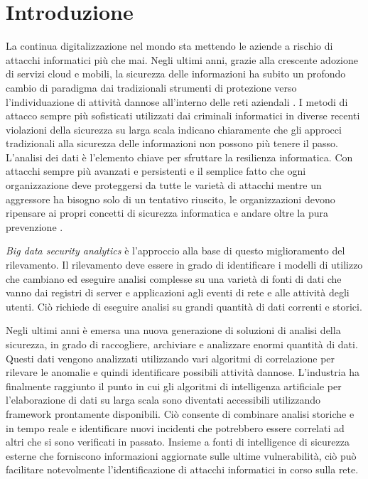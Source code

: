 \documentclass[../main.tex]{subfiles}
\begin{document}
\chapter{Introduzione}

La continua digitalizzazione nel mondo sta mettendo le aziende a rischio di attacchi informatici più che mai. Negli ultimi anni, grazie alla crescente adozione di servizi cloud e mobili, la sicurezza delle informazioni ha subito un profondo cambio di paradigma dai tradizionali strumenti di protezione verso l'individuazione di attività dannose all'interno delle reti aziendali \cite{intro}.
I metodi di attacco sempre più sofisticati utilizzati dai criminali informatici in diverse recenti violazioni della sicurezza su larga scala indicano chiaramente che gli approcci tradizionali alla sicurezza delle informazioni non possono più tenere il passo. 
L'analisi dei dati è l'elemento chiave per sfruttare la resilienza informatica. Con attacchi sempre più avanzati e persistenti e il semplice fatto che ogni organizzazione deve proteggersi da tutte le varietà di attacchi mentre un aggressore ha bisogno solo di un tentativo riuscito, le organizzazioni devono ripensare ai propri concetti di sicurezza informatica e andare oltre la pura prevenzione \cite{bigdata}.

\textit{Big data security analytics} è l'approccio alla base di questo miglioramento del rilevamento. Il rilevamento deve essere in grado di identificare i modelli di utilizzo che cambiano ed eseguire analisi complesse su una varietà di fonti di dati che vanno dai registri di server e applicazioni agli eventi di rete e alle attività degli utenti.
Ciò richiede di eseguire analisi su grandi quantità di dati correnti e storici.

Negli ultimi anni è emersa una nuova generazione di soluzioni di analisi della sicurezza, in grado di raccogliere, archiviare e analizzare enormi quantità di dati. Questi dati vengono analizzati utilizzando vari algoritmi di correlazione per rilevare le anomalie e quindi identificare possibili attività dannose.
L'industria ha finalmente raggiunto il punto in cui gli algoritmi di intelligenza artificiale per l'elaborazione di dati su larga scala sono diventati accessibili utilizzando framework prontamente disponibili.
Ciò consente di combinare analisi storiche e in tempo reale e identificare nuovi incidenti che potrebbero essere correlati ad altri che si sono verificati in passato. Insieme a fonti di intelligence di sicurezza esterne che forniscono informazioni aggiornate sulle ultime vulnerabilità, ciò può facilitare notevolmente l'identificazione di attacchi informatici in corso sulla rete.
\end{document}
